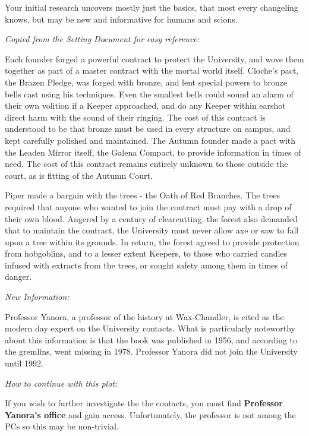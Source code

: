 \documentclass[green]{gl2018}
\begin{document}
\name{\gThreeContractsStart{}}



Your initial research uncovers mostly just the basics, that most every changeling knows, but may be new and informative for humans and scions.

\emph{Copied from the Setting Document for easy reference:}
\begin{changemargin}{3cm}{3cm}
Each founder forged a powerful contract to protect the University, and wove them together as part of a master contract with the mortal world itself. Cloche's pact, the Brazen Pledge, was forged with bronze, and lent special powers to bronze bells cast using his techniques. Even the smallest bells could sound an alarm of their own volition if a Keeper approached, and do any Keeper within earshot direct harm with the sound of their ringing. The cost of this contract is understood to be that bronze must be used in every structure on campus, and kept carefully polished and maintained. The Autumn founder made a pact with the Leaden Mirror itself, the Galena Compact, to provide information in times of need. The cost of this contract remains entirely unknown to those outside the court, as is fitting of the Autumn Court.

Piper made a bargain with the trees - the Oath of Red Branches. The trees required that anyone who wanted to join the contract must pay with a drop of their own blood. Angered by a century of clearcutting, the forest also demanded that to maintain the contract, the University must never allow axe or saw to fall upon a tree within its grounds. In return, the forest agreed to provide protection from hobgoblins, and to a lesser extent Keepers, to those who carried candles infused with extracts from the trees, or sought safety among them in times of danger.
\end{changemargin}

\emph{New Information:}
\begin{changemargin}{3cm}{3cm}
Professor Yanora, a professor of the history at Wax-Chandler, is cited as the modern day expert on the University contacts. What is particularly noteworthy about this information is that the book was published in 1956, and according to the gremlins, went missing in 1978. Professor Yanora did not join the University until 1992.
\end{changemargin}

\emph{How to continue with this plot:}
\begin{changemargin}{3cm}{3cm}
If you wish to further investigate the the contacts, you must find {\bf Professor Yanora's office} and gain access.  Unfortunately, the professor is not among the PCs so this may be non-trivial.
\end{changemargin}
\end{document}
